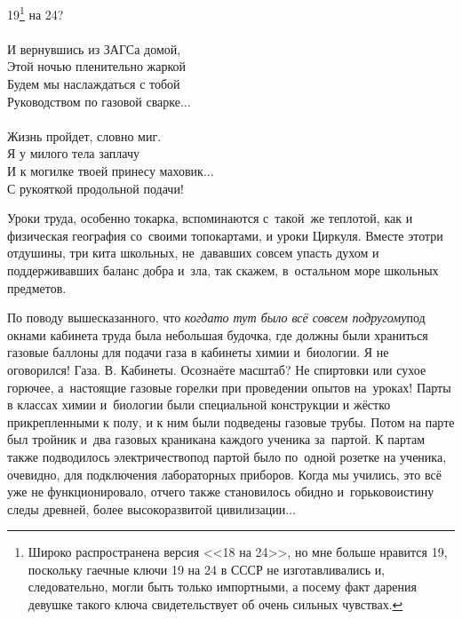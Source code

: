 {\hspace*{2.7cm}19\footnote[1]{Широко распространена версия <<18 на 24>>, но мне больше нравится 19, поскольку гаечные ключи 19 на 24 в СССР не изготавливались и, следовательно, могли быть только импортными, а посему факт дарения девушке такого ключа свидетельствует об очень сильных чувствах.} на 24?\\
\\
\hspace*{2.7cm}И вернувшись из ЗАГСа домой,\\
\hspace*{2.7cm}Этой ночью пленительно жаркой\\
\hspace*{2.7cm}Будем мы наслаждаться с тобой\\
\hspace*{2.7cm}Руководством по газовой сварке$\ldots$\\
\\
\hspace*{2.7cm}Жизнь пройдет, словно миг.\\
\hspace*{2.7cm}Я у милого тела заплачу\\
\hspace*{2.7cm}И к могилке твоей принесу маховик$\ldots$\\
\hspace*{2.7cm}С рукояткой продольной подачи!\\ 
}
\vspace{0.5cm}

Уроки труда, особенно токарка, вспоминаются с~такой~же теплотой, как и физическая география со~своими топокартами, и уроки Циркуля. Вместе это\mdash три отдушины, три кита школьных, не~дававших совсем упасть духом и поддерживавших баланс добра и~зла, так скажем, в~остальном море школьных предметов.%

По поводу вышесказанного, что \textit{когда\sdash то тут было всё совсем по\sdash другому}\mdash под окнами кабинета труда была небольшая будочка, где должны были храниться газовые баллоны для подачи газа в кабинеты химии и~биологии. Я не оговорился! Газа. В. Кабинеты. Осознаёте масштаб? Не спиртовки или сухое горючее, а~настоящие газовые горелки при проведении опытов на~уроках! Парты в классах химии и~биологии были специальной конструкции и жёстко прикрепленными к полу, и к ним были подведены газовые трубы. Потом на парте был тройник и~два газовых краника\mdash на каждого ученика за~партой. К партам также подводилось электричество\mdash под партой было по~одной розетке на ученика, очевидно, для подключения лабораторных приборов. Когда мы учились, это всё уже не функционировало, отчего также становилось обидно и~горько\mdash воистину следы древней, более высокоразвитой цивилизации$\ldots$

